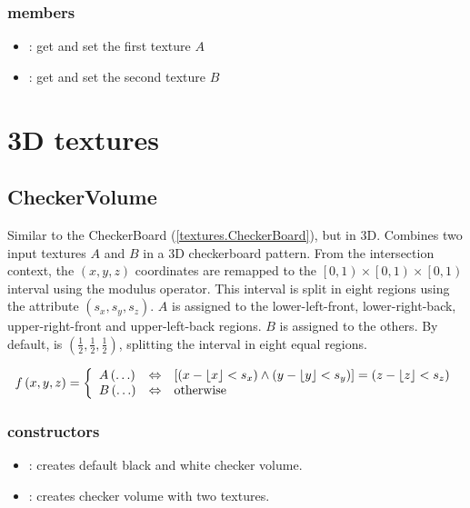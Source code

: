 \subsubsection*{members}
\begin{itemize}
	\item {}:
		get and set the first texture $A$
	\item {}:
		get and set the second texture $B$
\end{itemize}

\section{3D textures} %



\subsection{CheckerVolume}

Similar to the CheckerBoard (\ref{textures.CheckerBoard}), but in 3D.  Combines two input textures $A$ and $B$ in a 3D checkerboard pattern.  From the intersection context, the $\left(x, y, z\right)$ coordinates are remapped to the $\left[0, 1\right) \times \left[0, 1\right) \times \left[0, 1\right)$ interval using the modulus operator.  This interval is split in eight regions using the  attribute $\left(s_x, s_y, s_z\right)$.  $A$ is assigned to the lower-left-front, lower-right-back, upper-right-front and upper-left-back regions. $B$ is assigned to the others.  By default,  is $\left(\frac 1 2, \frac 1 2, \frac 1 2\right)$, splitting the interval in eight equal regions.

\begin{equation}
	f\left(x, y, z\right) = \left\{
		\begin{array}{lcl}
			A\left(\ldots\right) & \Leftrightarrow &
				\left[
					\left(x - \left\lfloor x \right\rfloor < s_x\right) \wedge
					\left(y - \left\lfloor y \right\rfloor < s_y\right)
				\right] =
				\left(z - \left\lfloor z \right\rfloor < s_z\right) \\
			B\left(\ldots\right) & \Leftrightarrow & \textnormal{otherwise}
		\end{array}
	\right.
\end{equation}

\subsubsection*{constructors}
\begin{itemize}
	\item {}:
		creates default black and white checker volume.
	\item {}:
		creates checker volume with two textures.
\end{itemize}

